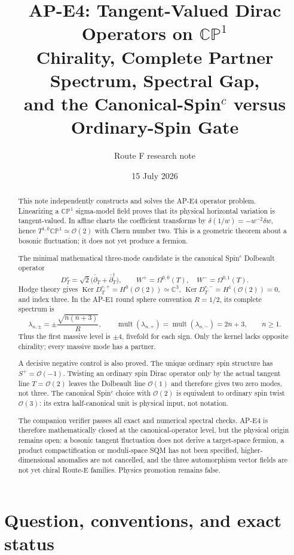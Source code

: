 \documentclass[11pt]{article}
\title{AP-E4: Tangent-Valued Dirac Operators on \(\mathbb{CP}^1\)\\
Chirality, Complete Partner Spectrum, Spectral Gap,\\
and the Canonical-Spin\texorpdfstring{\(^c\)}{c} versus Ordinary-Spin Gate}
\author{Route F research note}
\date{15 July 2026}
\theoremstyle{definition}
\theoremstyle{remark}
\newcommand{\CC}{\mathbb C}
\newcommand{\CP}{\mathbb {CP}}
\newcommand{\cO}{\mathcal O}
\newcommand{\Ker}{\operatorname{Ker}}
\begin{document}
\maketitle

\begin{abstract}
This note independently constructs and solves the AP-E4 operator problem.
Linearizing a \(\CP^1\) sigma-model field proves that its physical horizontal
variation is tangent-valued.  In affine charts the coefficient transforms by
\(\delta(1/w)=-w^{-2}\delta w\), hence
\(T^{1,0}\CP^1\simeq\cO(2)\) with Chern number two.  This is a geometric
theorem about a bosonic fluctuation; it does not yet produce a fermion.

The minimal mathematical three-mode candidate is the canonical
Spin\({}^c\) Dolbeault operator
\[
 D_T^c=\sqrt2\bigl(\bar\partial_T+\bar\partial_T^\dagger\bigr),
 \qquad
 W^+=\Omega^{0,0}(T),\quad W^-=\Omega^{0,1}(T).
\]
Hodge theory gives
\(\Ker D_T^{c,+}=H^0(\cO(2))\simeq\CC^3\),
\(\Ker D_T^{c,-}=H^1(\cO(2))=0\), and index three.  In the AP-E1 round
sphere convention \(R=1/2\), its complete spectrum is
\[
 \lambda_{n,\pm}=\pm\frac{\sqrt{n(n+3)}}{R},\qquad
 \operatorname{mult}(\lambda_{n,+})=
 \operatorname{mult}(\lambda_{n,-})=2n+3,\qquad n\ge1.
\]
Thus the first massive level is \(\pm4\), fivefold for each sign.  Only the
kernel lacks opposite chirality; every massive mode has a partner.

A decisive negative control is also proved.  The unique ordinary spin
structure has \(S^+=\cO(-1)\).  Twisting an ordinary spin Dirac operator only
by the actual tangent line \(T=\cO(2)\) leaves the Dolbeault line \(\cO(1)\)
and therefore gives two zero modes, not three.  The canonical Spin\({}^c\)
choice with \(\cO(2)\) is equivalent to ordinary spin twist \(\cO(3)\): its
extra half-canonical unit is physical input, not notation.

The companion verifier passes all exact and numerical spectral checks.
AP-E4 is therefore mathematically closed at the canonical-operator level,
but the physical origin remains open: a bosonic tangent fluctuation does not
derive a target-space fermion, a product compactification or moduli-space SQM
has not been specified, higher-dimensional anomalies are not cancelled, and
the three automorphism vector fields are not yet chiral Route-E families.
Physics promotion remains false.
\end{abstract}

\tableofcontents

\section{Question, conventions, and exact status}
\end{document}
